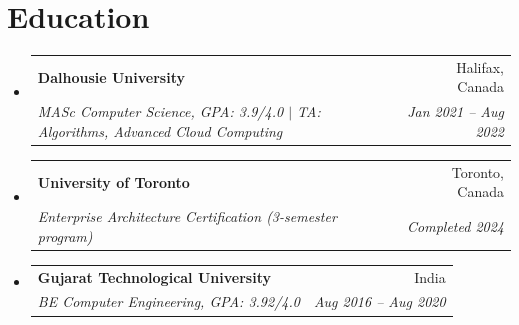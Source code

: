 \documentclass[letterpaper,9.5pt]{article}
\makeatletter
\newcommand{\resumeSubheading}[4]{\vspace{-2pt}\item\begin{tabular*}{0.97\textwidth}{l@{\extracolsep{\fill}}r}\textbf{#1} & #2 \\\textit{\small#3} & \textit{\small #4} \\\end{tabular*}\vspace{-6pt}}
\newcommand{\resumeSubHeadingListStart}{\begin{itemize}[leftmargin=*]}
\newcommand{\resumeSubHeadingListEnd}{\end{itemize}}
\makeatother
\begin{document}
\section{Education}
\resumeSubHeadingListStart
  \resumeSubheading
    {Dalhousie University}{Halifax, Canada}
    {MASc Computer Science, GPA: 3.9/4.0 $|$ TA: Algorithms, Advanced Cloud Computing}{Jan 2021 -- Aug 2022}
  \resumeSubheading
    {University of Toronto}{Toronto, Canada}
    {Enterprise Architecture Certification (3-semester program)}{Completed 2024}
  \resumeSubheading
    {Gujarat Technological University}{India}
    {BE Computer Engineering, GPA: 3.92/4.0}{Aug 2016 -- Aug 2020}
\resumeSubHeadingListEnd
\end{document}
